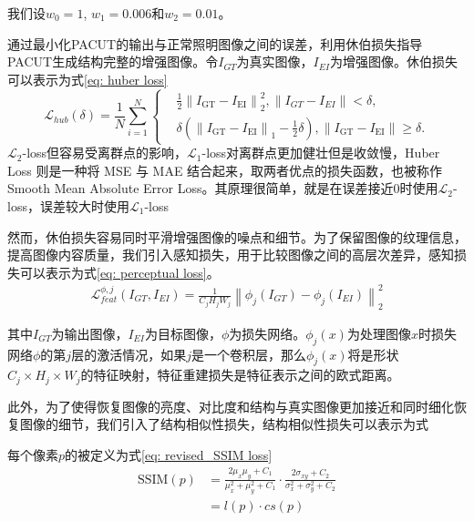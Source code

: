 \documentclass[a4paper]{ctexart}
\begin{document}
	我们设$w_0 = 1$, $w_1 = 0.006$和$w_2 = 0.01$。
	
	通过最小化PACUT的输出与正常照明图像之间的误差，利用休伯损失指导PACUT生成结构完整的增强图像。令$I_{GT}$为真实图像，$I_{EI}$为增强图像。休伯损失可以表示为式\ref{eq: huber loss}
	\begin{equation}
		\mathcal{L}_{hub}(\delta)= \frac{1}{N}\sum_{i=1}^{N}
		\left\{
		\begin{aligned}
			&\displaystyle{\frac{1}{2}{\left\|I_{\text{GT}} - I_{\text{EI}} \right\|}_2^{2}, \left\| I_{GT} -I_{EI} \right\| < \delta }, \\
			&\delta\left({\left\|I_{\text{GT}} - I_{\text{EI}} \right\|}_1 - \frac{1}{2}\delta \right), \left\| I_{\text{GT}} -I_{\text{EI}} \right\| \geq \delta.
		\end{aligned}
		\label{eq: huber loss}
		\right.
	\end{equation}
	$\mathcal{L}_2$-loss但容易受离群点的影响，$\mathcal{L}_1$-loss对离群点更加健壮但是收敛慢，Huber Loss 则是一种将 MSE 与 MAE 结合起来，取两者优点的损失函数，也被称作Smooth Mean Absolute Error Loss。其原理很简单，就是在误差接近0时使用$\mathcal{L}_2$-loss，误差较大时使用$\mathcal{L}_1$-loss
	
	然而，休伯损失容易同时平滑增强图像的噪点和细节。为了保留图像的纹理信息，提高图像内容质量，我们引入感知损失，用于比较图像之间的高层次差异，感知损失可以表示为式\ref{eq: perceptual loss}。
	\begin{equation}
		\begin{aligned}
			\mathcal{L}_{feat}^{\phi,j} (I_{GT},I_{EI}) = \frac{1}{C_{j}H_{j}W_{j}}{\left\| \phi_{j}(I_{GT})-\phi_{j}(I_{EI})\right\|}_{2}^2
		\end{aligned}
		\label{eq: perceptual loss}
	\end{equation}
	
	其中$I_{GT}$为输出图像，$I_{EI}$为目标图像，$\phi$为损失网络。$\phi_{j}(x)$为处理图像$x$时损失网络$\phi$的第$j$层的激活情况，如果$j$是一个卷积层，那么$\phi_{j}(x)$将是形状$C_{j} \times H_{j} \times W_{j}$的特征映射，特征重建损失是特征表示之间的欧式距离。
	
	此外，为了使得恢复图像的亮度、对比度和结构与真实图像更加接近和同时细化恢复图像的细节，我们引入了结构相似性损失，结构相似性损失可以表示为式
	
	每个像素$p$的被定义为式\ref{eq: revised_SSIM loss}
	\begin{equation}
		\begin{aligned}
			\text{SSIM}(p) &= \frac{2\mu_{x}\mu_{y}+C_{1}}{\mu_{x}^2+\mu_{y}^2+C_{1}} \cdot \frac{2\sigma_{xy}+C_{2}}{\sigma_{x}^2+\sigma_{y}^{2}+C_{2}} \\
			&= l(p)\cdot cs(p)
		\end{aligned}
		\label{eq: SSIM}
	\end{equation}
	
\end{document}
